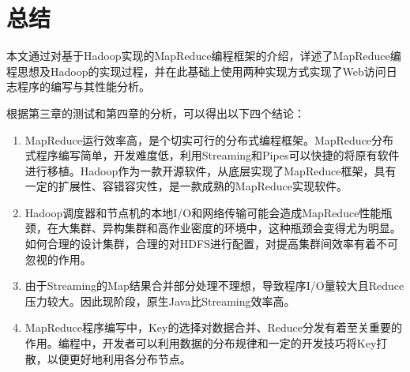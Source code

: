 \chapter{总结}
\label{chap:5}

本文通过对基于Hadoop实现的MapReduce编程框架的介绍，详述了MapReduce编程思想及Hadoop的实现过程，并在此基础上使用两种实现方式实现了Web访问日志程序的编写与其性能分析。

根据第三章的测试和第四章的分析，可以得出以下四个结论：

\begin{enumerate}
\item MapReduce运行效率高，是个切实可行的分布式编程框架。MapReduce分布式程序编写简单，开发难度低，利用Streaming和Pipes可以快捷的将原有软件进行移植。Hadoop作为一款开源软件，从底层实现了MapReduce框架，具有一定的扩展性、容错容灾性，是一款成熟的MapReduce实现软件。
\item Hadoop调度器和节点机的本地I/O和网络传输可能会造成MapReduce性能瓶颈，在大集群、异构集群和高作业密度的环境中，这种瓶颈会变得尤为明显。如何合理的设计集群，合理的对HDFS进行配置，对提高集群间效率有着不可忽视的作用。
\item 由于Streaming的Map结果合并部分处理不理想，导致程序I/O量较大且Reduce压力较大。因此现阶段，原生Java比Streaming效率高。
\item MapReduce程序编写中，Key的选择对数据合并、Reduce分发有着至关重要的作用。编程中，开发者可以利用数据的分布规律和一定的开发技巧将Key打散，以便更好地利用各分布节点。
\end{enumerate}